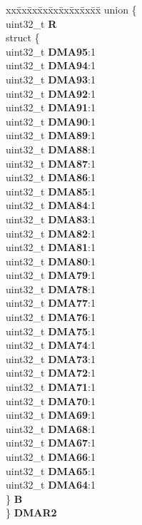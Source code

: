\begin{DoxyCompactItemize}
\begin{tabbing}
\end{tabbing}\item 
\mbox{\label{structADC__tag_af55c546ee763a7d95f92930af14f183a}} 
\begin{tabbing}
xx\=xx\=xx\=xx\=xx\=xx\=xx\=xx\=xx\=\kill
union \{\\
\>uint32\_t {\bfseries R}\\
\>struct \{\\
\>\>uint32\_t {\bfseries DMA95}:1\\
\>\>uint32\_t {\bfseries DMA94}:1\\
\>\>uint32\_t {\bfseries DMA93}:1\\
\>\>uint32\_t {\bfseries DMA92}:1\\
\>\>uint32\_t {\bfseries DMA91}:1\\
\>\>uint32\_t {\bfseries DMA90}:1\\
\>\>uint32\_t {\bfseries DMA89}:1\\
\>\>uint32\_t {\bfseries DMA88}:1\\
\>\>uint32\_t {\bfseries DMA87}:1\\
\>\>uint32\_t {\bfseries DMA86}:1\\
\>\>uint32\_t {\bfseries DMA85}:1\\
\>\>uint32\_t {\bfseries DMA84}:1\\
\>\>uint32\_t {\bfseries DMA83}:1\\
\>\>uint32\_t {\bfseries DMA82}:1\\
\>\>uint32\_t {\bfseries DMA81}:1\\
\>\>uint32\_t {\bfseries DMA80}:1\\
\>\>uint32\_t {\bfseries DMA79}:1\\
\>\>uint32\_t {\bfseries DMA78}:1\\
\>\>uint32\_t {\bfseries DMA77}:1\\
\>\>uint32\_t {\bfseries DMA76}:1\\
\>\>uint32\_t {\bfseries DMA75}:1\\
\>\>uint32\_t {\bfseries DMA74}:1\\
\>\>uint32\_t {\bfseries DMA73}:1\\
\>\>uint32\_t {\bfseries DMA72}:1\\
\>\>uint32\_t {\bfseries DMA71}:1\\
\>\>uint32\_t {\bfseries DMA70}:1\\
\>\>uint32\_t {\bfseries DMA69}:1\\
\>\>uint32\_t {\bfseries DMA68}:1\\
\>\>uint32\_t {\bfseries DMA67}:1\\
\>\>uint32\_t {\bfseries DMA66}:1\\
\>\>uint32\_t {\bfseries DMA65}:1\\
\>\>uint32\_t {\bfseries DMA64}:1\\
\>\} {\bfseries B}\\
\} {\bfseries DMAR2}\\


\end{tabbing}
\end{DoxyCompactItemize}
